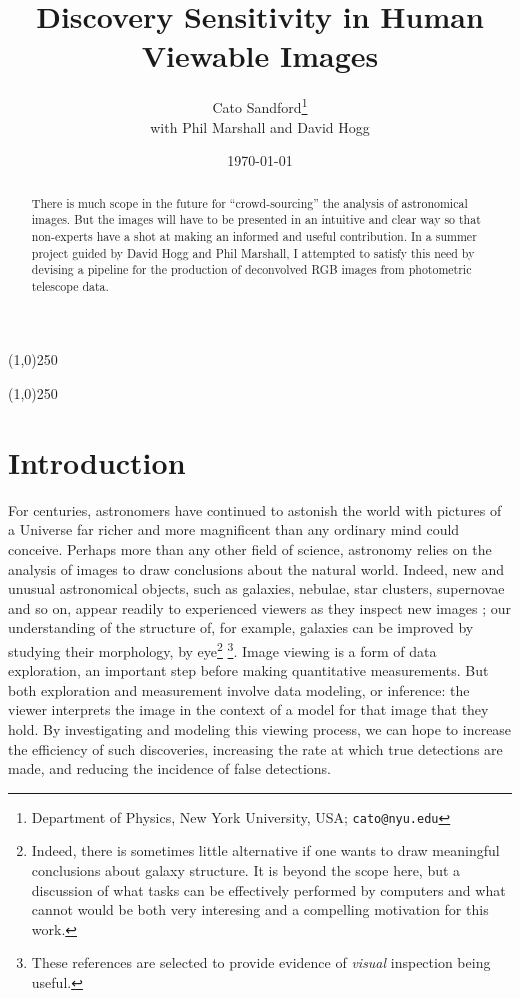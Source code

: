 \documentclass[letterpaper, 11pt]{article}
\title{Discovery Sensitivity in Human Viewable Images}
\author{Cato Sandford\thanks{Department of Physics, New York University, USA; \texttt{cato@nyu.edu}}\\ \small with Phil Marshall and David Hogg}
\date{\today}
\begin{document}
\maketitle
\vspace{1cm}


\begin{abstract}
There is much scope in the future for ``crowd-sourcing'' the analysis of astronomical images. But the images will have to be presented in an intuitive and clear way so that non-experts have a shot at making an informed and useful contribution. In a summer project guided by David Hogg and Phil Marshall, I attempted to satisfy this need by devising a pipeline for the production of deconvolved RGB images from photometric telescope data.
\end{abstract}


\begin{center}
\line(1,0){250}
\end{center}
\vspace{-0.5cm}
\tableofcontents
\vspace{-0.1cm}
\begin{center}
\line(1,0){250}
\end{center}
\newpage



\section{Introduction}
\label{sec:intro}

For centuries, astronomers have continued to astonish the world with pictures of a Universe far richer and more magnificent than any ordinary mind could conceive. Perhaps more than any other field of science, astronomy relies on the analysis of images to draw conclusions about the natural world. Indeed, new and unusual astronomical objects, such as
galaxies, nebulae, star clusters, supernovae and so on, appear readily to
experienced viewers as they inspect new images \citep[a recent example is the amateur discovery of a quadruple star system, reported in][]{PH12}; our understanding of  the structure of, for example, galaxies can
be improved by studying their morphology, by eye\footnote{Indeed, there is sometimes little alternative if one wants to draw meaningful conclusions about galaxy structure. It is beyond the scope here, but a discussion of what tasks can be effectively performed by computers and what cannot would be both very interesing and a compelling motivation for this work.} \citep[e.g.][]{Lah95, Lah++95, For++11, But11}\footnote{These references are selected to provide evidence of \emph{visual} inspection being useful.}.
Image viewing is a form of data exploration, an important step before making
quantitative measurements. But both exploration and measurement involve data
modeling, or inference: the viewer interprets the image in the context of a
model for that image that they hold.  By investigating and modeling this
viewing process, we can hope to increase the efficiency of such discoveries,
increasing the rate at which true detections are made, and reducing the
incidence of false detections. 
\end{document}
